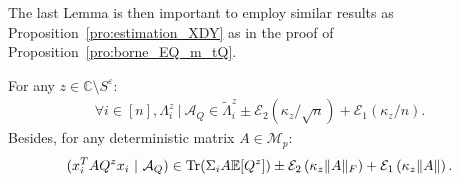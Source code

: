 \documentclass[a4papaer, titlepage]{book}
\begin{document}
The last Lemma is then important to employ similar results as Proposition~\ref{pro:estimation_XDY} as in the proof of Proposition~\ref{pro:borne_EQ_m_tQ}.
\begin{lemma}\label{lem:concentration xQx}
  For any $z \in  \mathbb C \setminus S^\varepsilon $:
\begin{align*}
  \forall i \in [n], \Lambda_i^z \ | \ \mathcal A_Q \in \tilde \Lambda_i^z \pm \mathcal E_2(\kappa_z/\sqrt n) + \mathcal E_1(\kappa_z/n).
\end{align*}
  Besides, for any deterministic matrix $A \in \mathcal{M}_{p}$:
  \begin{align*}
     (x_i^T AQ^zx_i \ | \ \mathcal A_Q) \in \operatorname{Tr}(\Sigma_i A\mathbb E[Q^z]) \pm\mathcal E_2 \left( \kappa_z \|A\|_F\right) + \mathcal E_1 \left( \kappa_z \|A\|\right).
  \end{align*} 
\end{lemma}
\end{document}

